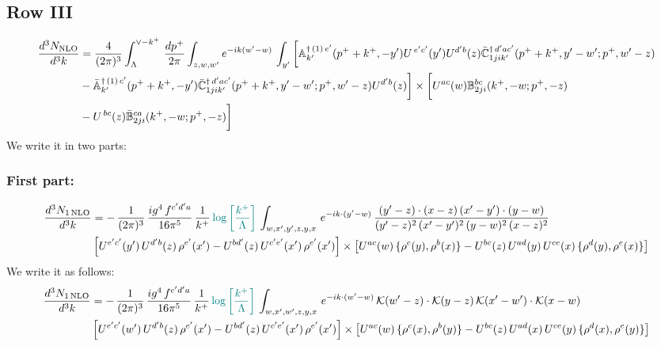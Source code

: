 \documentclass[9pt]{article}
\def\mf#1{\mathbb{#1}}
\numberwithin{equation}{section}
\begin{document}
 \subsection{Row III}
 \begin{align}
    \frac{d^{3}N_{\rm NLO}}{d^{3}k} & =   \frac{4}{(2\pi)^{3}} \int_{\Lambda}^{\vee -k^{+}}\, \frac{dp^{+}}{2\pi}\int_{z,w,w^{\prime}} e^{-ik(w^{\prime}-w)}\,\int_{y^{\prime}}\bigg[\mf{A}^{\dagger\, (1)\,e^{\prime}}_{k^{\prime}}(p^{+}+k^{+},-y^{\prime})U^{\, e^{\prime}c^{\prime}}(y^{\prime})U^{d^{\prime}b}(z) \Bar{\mf{C}}^{\dagger\, d^{\prime}ac^{\prime}}_{1jik^{\prime}}(p^{+}+k^{+},y^{\prime}-w^{\prime}; p^{+},w^{\prime}-z)\notag \\ &  -\Bar{\mf{A}}^{\dagger\, (1)\,c^{\prime}}_{k^{\prime}}(p^{+}+k^{+},-y^{\prime}) \Bar{\mf{C}}^{\dagger\, d^{\prime}ac^{\prime}}_{1jik^{\prime}}(p^{+}+k^{+},y^{\prime}-w^{\prime}; p^{+},w^{\prime}-z)U^{d^{\prime}b}(z)\bigg] \times \bigg[U^{ac}(w) \mf{B}^{bc}_{2ji}(k^{+},-w;p^{+},-z)\notag \\ &  -U^{\, bc}(z)\Bar{\mf{B}}^{ca}_{2ji}(k^{+},-w; p^{+},-z)\bigg]\nonumber
\end{align}
We write it in two parts:
\subsubsection{First part:}
\begin{align}
     \frac{d^{3}N_{1\,\rm NLO}}{d^{3}k} & = -\,\frac{1}{(2\pi)^{3}}\, \frac{ig^{4}\,f^{c'd'a}}{16\pi^{5}}\, \frac{1}{k^{+}}\,{\color{teal}\log{\left[\frac{k^{+}}{\Lambda}\right]}}\, \int_{w,x',y',z,y,x}\, e^{-ik\cdot (y'-w)}\,\frac{(y'-z)\cdot (x-z)\,(x'-y')\cdot (y-w)}{(y'-z)^{2}\,(x'-y')^{2}\,(y-w)^{2}\,(x-z)^{2}}\notag \\ &  \left[U^{e'c'}(y')\,U^{d'b}(z)\,\rho^{e'}(x')-U^{bd'}(z)\,U^{c'e'}(x')\,\rho^{e'}(x')\right]\times  \left[U^{ac}(w)\, \{\rho^{c}(y),\rho^{b}(x)\}-U^{bc}(z)\,U^{ad}(y)\,U^{ce}(x)\,\{\rho^{d}(y),\rho^{e}(x)\}\right]
\end{align} 
We write it as follows:
\begin{align}
     \frac{d^{3}N_{1\,\rm NLO}}{d^{3}k} & = -\,\frac{1}{(2\pi)^{3}}\, \frac{ig^{4}\,f^{c'd'a}}{16\pi^{5}}\, \frac{1}{k^{+}}\,{\color{teal}\log{\left[\frac{k^{+}}{\Lambda}\right]}}\, \int_{w,x',w',z,y,x}\, e^{-ik\cdot (w'-w)}\,\mathcal{K}(w'-z)\cdot \mathcal{K}(y-z)\,\mathcal{K}(x'-w')\cdot \mathcal{K}(x-w)\notag \\ &  \left[U^{e'c'}(w')\,U^{d'b}(z)\,\rho^{e'}(x')-U^{bd'}(z)\,U^{c'e'}(x')\,\rho^{e'}(x')\right]\times  \left[U^{ac}(w)\, \{\rho^{c}(x),\rho^{b}(y)\}-U^{bc}(z)\,U^{ad}(x)\,U^{ce}(y)\,\{\rho^{d}(x),\rho^{e}(y)\}\right]
\end{align} 
\end{document}
